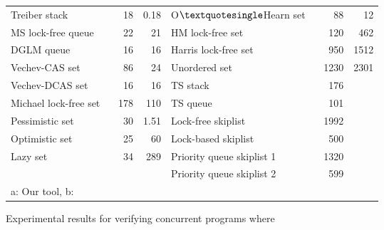 \begin{figure}[]
\begin{tabular}{|l | r| r | l | r | r |}


\textsf{Treiber stack  ~\cite{Treiber:stack}} & \textsf {18} & \textsf {0.18} & \textsf {O$\textquotesingle $Hearn set  ~\cite{OHearnlist}} & \textsf{88} & \textsf{12} \\
\textsf{MS lock-free queue  ~\cite{MS:QueueAlgorithms}}& \textsf{22} & \textsf {21} & \textsf{HM lock-free set  ~\cite{ArtOfMpP} } & \textsf{120} & \textsf{462} \\
\textsf{DGLM queue  ~\cite{Doherty:lockfree}}&  \textsf {16} & \textsf{16} & \textsf{Harris lock-free set  ~\cite{Harris:list}} & \textsf{950} & \textsf {1512} \\
\textsf{Vechev-CAS set  ~\cite{Vechev:list}}  & \textsf{86} & \textsf {24} & \textsf{Unordered set  ~\cite{Zhang:unorderedlist}} & \textsf{1230} & \textsf {2301} \\
\cline{4-5}
\textsf{Vechev-DCAS set  ~\cite{Vechev:list}}   & \textsf{16} & \textsf{16} & \textsf{TS stack  ~\cite{ts-stack}}  & \textsf{176} &\\
\textsf{Michael lock-free set ~\cite{Michael:list}}  & \textsf{178} & \textsf{110} & \textsf{TS queue  ~\cite{ts-stack}} & \textsf{101} &\\
\cline{4-5}
\textsf{Pessimistic set  ~\cite{ArtOfMpP}}&\textsf{30} & \textsf{1.51} & \textsf{Lock-free skiplist   ~\cite{ArtOfMpP}}& \textsf{1992} & \\
\textsf{Optimistic set ~\cite{ArtOfMpP}}& \textsf{25} & \textsf{60} & \textsf{Lock-based skiplist ~\cite{lockskiplist}}& \textsf{500} & \\
\textsf{Lazy set ~\cite{Lazyset}}  & \textsf {34} & \textsf{289} & \textsf{Priority queue skiplist 1 ~\cite{Shavit:queue}} &\textsf{1320} & \\
& & &\textsf{Priority queue skiplist 2~\cite{Linden:opodis13}}  &  \textsf{599} &\\
\hline
 \multicolumn{1}{l}{\textsf{a: Our tool, b:~\cite{Quy:sas16} }} & \multicolumn{1}{l}{}  & \multicolumn{1}{l}{} & \multicolumn{1}{l}{} & \multicolumn{1}{l}{} \\
\end{tabular}

\caption{Experimental results for verifying concurrent programs where}
\label{Experiments:fig}
\end{figure}
